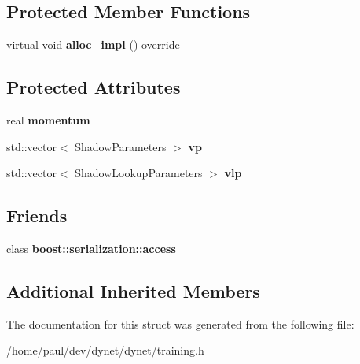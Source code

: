 \subsection*{Protected Member Functions}
\begin{DoxyCompactItemize}
\item 
\hypertarget{structdynet_1_1MomentumSGDTrainer_a904d0442ffa5d18463ca529ee07a1af2}{}virtual void {\bfseries alloc\+\_\+impl} () override\label{structdynet_1_1MomentumSGDTrainer_a904d0442ffa5d18463ca529ee07a1af2}

\end{DoxyCompactItemize}
\subsection*{Protected Attributes}
\begin{DoxyCompactItemize}
\item 
\hypertarget{structdynet_1_1MomentumSGDTrainer_a61b272617d6a7a80f13f4c8d03215a7b}{}real {\bfseries momentum}\label{structdynet_1_1MomentumSGDTrainer_a61b272617d6a7a80f13f4c8d03215a7b}

\item 
\hypertarget{structdynet_1_1MomentumSGDTrainer_af6d25b4fbf842543c8de00470bfa0cbc}{}std\+::vector$<$ Shadow\+Parameters $>$ {\bfseries vp}\label{structdynet_1_1MomentumSGDTrainer_af6d25b4fbf842543c8de00470bfa0cbc}

\item 
\hypertarget{structdynet_1_1MomentumSGDTrainer_aea8235a50ab0e66768bd453e01cb406a}{}std\+::vector$<$ Shadow\+Lookup\+Parameters $>$ {\bfseries vlp}\label{structdynet_1_1MomentumSGDTrainer_aea8235a50ab0e66768bd453e01cb406a}

\end{DoxyCompactItemize}
\subsection*{Friends}
\begin{DoxyCompactItemize}
\item 
\hypertarget{structdynet_1_1MomentumSGDTrainer_ac98d07dd8f7b70e16ccb9a01abf56b9c}{}class {\bfseries boost\+::serialization\+::access}\label{structdynet_1_1MomentumSGDTrainer_ac98d07dd8f7b70e16ccb9a01abf56b9c}

\end{DoxyCompactItemize}
\subsection*{Additional Inherited Members}


The documentation for this struct was generated from the following file\+:\begin{DoxyCompactItemize}
\item 
/home/paul/dev/dynet/dynet/training.\+h\end{DoxyCompactItemize}
